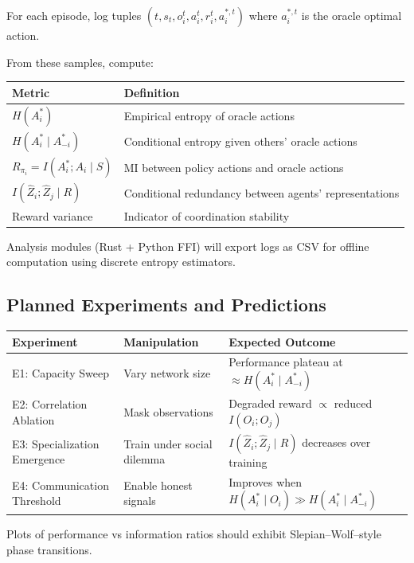 \documentclass[10pt, letterpaper]{article}
\begin{document}
For each episode, log tuples $(t, s_t, o_i^t, a_i^t, r_i^t, a_i^{*,t})$ where $a_i^{*,t}$ is the oracle optimal action.

From these samples, compute:

\begin{center}
\begin{tabular}{ll}
\toprule
\textbf{Metric} & \textbf{Definition} \\
\midrule
$H(A_i^*)$ & Empirical entropy of oracle actions \\
$H(A_i^* \mid A_{-i}^*)$ & Conditional entropy given others' oracle actions \\
$R_{\pi_i} = I(A_i^*; A_i \mid S)$ & MI between policy actions and oracle actions \\
$I(\hat{Z}_i; \hat{Z}_j \mid R)$ & Conditional redundancy between agents' representations \\
Reward variance & Indicator of coordination stability \\
\bottomrule
\end{tabular}
\end{center}

Analysis modules (Rust + Python FFI) will export logs as CSV for offline computation using discrete entropy estimators.

\subsection{Planned Experiments and Predictions}

\begin{center}
\begin{tabular}{lll}
\toprule
\textbf{Experiment} & \textbf{Manipulation} & \textbf{Expected Outcome} \\
\midrule
E1: Capacity Sweep & Vary network size & Performance plateau at $\approx H(A_i^* \mid A_{-i}^*)$ \\
E2: Correlation Ablation & Mask observations & Degraded reward $\propto$ reduced $I(O_i; O_j)$ \\
E3: Specialization Emergence & Train under social dilemma & $I(\hat{Z}_i; \hat{Z}_j \mid R)$ decreases over training \\
E4: Communication Threshold & Enable honest signals & Improves when $H(A_i^* \mid O_i) \gg H(A_i^* \mid A_{-i}^*)$ \\
\bottomrule
\end{tabular}
\end{center}

Plots of performance vs information ratios should exhibit Slepian--Wolf--style phase transitions.
\end{document}
